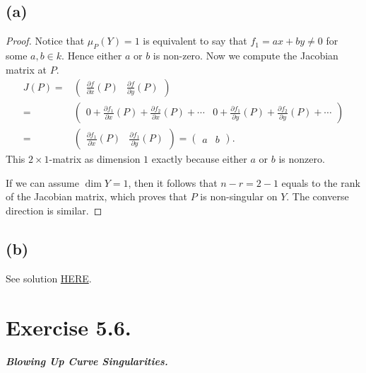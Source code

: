\subsection{(a)}
\begin{proof}
    Notice that $\mu_P(Y)=1$ is equivalent to say that $f_1=ax+by\neq 0$ for some $a,b\in k$. Hence either $a$ or $b$ is non-zero. 
    Now we compute the Jacobian matrix at $P$. 
    \begin{align*}
        J(P)=&\begin{pmatrix}
                \frac{\partial f}{\partial x}(P) & \frac{\partial f}{\partial y}(P)
            \end{pmatrix}\\
            =&\begin{pmatrix}
                    0+\frac{\partial f_1}{\partial x}(P)+\frac{\partial f_2}{\partial x}(P)+\cdots & 0+\frac{\partial f_1}{\partial y} (P)+\frac{\partial f_2}{\partial y}(P)+\cdots
            \end{pmatrix}\\
            =&\begin{pmatrix}
                \frac{\partial f_1}{\partial x}(P) & \frac{\partial f_1}{\partial y}(P)
            \end{pmatrix}=\begin{pmatrix}
                a & b
            \end{pmatrix}.
    \end{align*}
    This $2\times 1$-matrix as dimension $1$ exactly because either $a$ or $b$ is nonzero. 

    If we can  assume $\operatorname{dim}Y=1$, then it follows that $n-r=2-1$ equals to the rank of the Jacobian matrix, which proves that $P$ is non-singular on $Y$. The converse direction is similar. 

\end{proof}

\subsection{(b)}

See solution \href{https://math.berkeley.edu/~reb/courses/256A/1.5.pdf}{HERE}.

\section{Exercise 5.6.}
\textit{\textbf{Blowing Up Curve Singularities.}}
